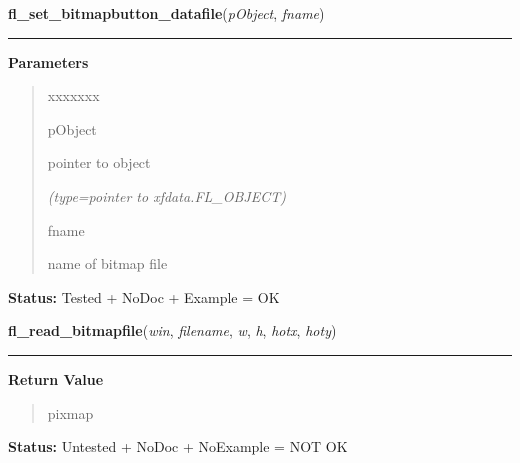 \hspace{.8\funcindent}\begin{boxedminipage}{\funcwidth}

    \raggedright \textbf{fl\_set\_bitmapbutton\_datafile}(\textit{pObject}, \textit{fname})

    \vspace{-1.5ex}

    \rule{\textwidth}{0.5\fboxrule}
\setlength{\parskip}{2ex}
\setlength{\parskip}{1ex}
      \textbf{Parameters}
      \vspace{-1ex}

      \begin{quote}
        \begin{Ventry}{xxxxxxx}

          \item[pObject]

          pointer to object

            {\it (type=pointer to xfdata.FL\_OBJECT)}

          \item[fname]

          name of bitmap file

        \end{Ventry}

      \end{quote}

\textbf{Status:} Tested + NoDoc + Example = OK



    \end{boxedminipage}

    \label{xformslib:library:fl_read_bitmapfile}

    \vspace{0.5ex}

\hspace{.8\funcindent}\begin{boxedminipage}{\funcwidth}

    \raggedright \textbf{fl\_read\_bitmapfile}(\textit{win}, \textit{filename}, \textit{w}, \textit{h}, \textit{hotx}, \textit{hoty})

    \vspace{-1.5ex}

    \rule{\textwidth}{0.5\fboxrule}
\setlength{\parskip}{2ex}
\setlength{\parskip}{1ex}
      \textbf{Return Value}
    \vspace{-1ex}

      \begin{quote}
      pixmap

      \end{quote}

\textbf{Status:} Untested + NoDoc + NoExample = NOT OK



    \end{boxedminipage}

